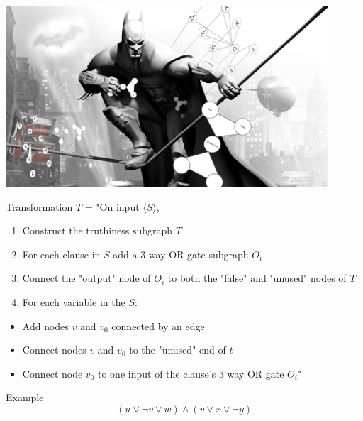 \documentclass[bigger]{beamer}
\begin{document}
\begin{frame}[label=sec-14]{}
\begin{center}
\includegraphics[width=12cm]{bats.png}
\end{center}
\end{frame}

\begin{frame}[label=sec-15]{Transformation}
\(T\) = "On input \(\langle S \rangle\),
\begin{enumerate}
\item<1-> Construct the truthiness subgraph \(T\)\\
\item<2-> For each clause in \(S\) add a 3 way OR gate subgraph \(O_i\)\\
\item<3-> Connect the "output" node of \(O_i\) to both the "false" and "unused" nodes of \(T\)
\item<4-> For each variable in the \(S\):
\end{enumerate}
\begin{itemize}
\item<5-> Add nodes \(v\) and \(v_0\) connected by an edge
\item<6-> Connect nodes \(v\) and \(v_0\) to the "unused" end of \(t\)
\item<7-> Connect node \(v_0\) to one input of the clause's 3 way OR gate \(O_i\)"
\end{itemize}
\end{frame}

\begin{frame}[label=sec-16]{Example}
\[
(u \vee \neg v \vee w) \wedge (v \vee x \vee \neg y)
\]
\end{frame}
\end{document}
